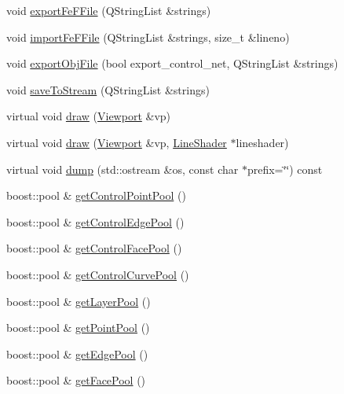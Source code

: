 \begin{DoxyCompactItemize}
\item 
void \hyperlink{classShipCAD_1_1SubdivisionSurface_ac6f3ca7c8c09acd6bc9c72ae063002bf}{export\-Fe\-F\-File} (Q\-String\-List \&strings)
\item 
void \hyperlink{classShipCAD_1_1SubdivisionSurface_aa3f1904bcec3f104cf465e3bed799406}{import\-Fe\-F\-File} (Q\-String\-List \&strings, size\-\_\-t \&lineno)
\item 
void \hyperlink{classShipCAD_1_1SubdivisionSurface_a8859af0a44d7f858d0febbd58efd2820}{export\-Obj\-File} (bool export\-\_\-control\-\_\-net, Q\-String\-List \&strings)
\item 
void \hyperlink{classShipCAD_1_1SubdivisionSurface_a77328f442672d72b4f9f1053b2cb2871}{save\-To\-Stream} (Q\-String\-List \&strings)
\item 
virtual void \hyperlink{classShipCAD_1_1SubdivisionSurface_acfe9cc964dbe05105486b43f2dc6fc4f}{draw} (\hyperlink{classShipCAD_1_1Viewport}{Viewport} \&vp)
\item 
virtual void \hyperlink{classShipCAD_1_1SubdivisionSurface_ab1c250ff9fa7acae3ecdca4575f3e259}{draw} (\hyperlink{classShipCAD_1_1Viewport}{Viewport} \&vp, \hyperlink{classShipCAD_1_1LineShader}{Line\-Shader} $\ast$lineshader)
\item 
virtual void \hyperlink{classShipCAD_1_1SubdivisionSurface_a6ed961bbb7ca5fe94ec5566109d9b015}{dump} (std\-::ostream \&os, const char $\ast$prefix=\char`\"{}\char`\"{}) const 
\item 
boost\-::pool \& \hyperlink{classShipCAD_1_1SubdivisionSurface_a49109b80a26f29ad52ac109574cf4d5a}{get\-Control\-Point\-Pool} ()
\item 
boost\-::pool \& \hyperlink{classShipCAD_1_1SubdivisionSurface_aa9ed4c00847b5c04f99b27f754df481b}{get\-Control\-Edge\-Pool} ()
\item 
boost\-::pool \& \hyperlink{classShipCAD_1_1SubdivisionSurface_ab9199097e998971add79f7dccbd262c3}{get\-Control\-Face\-Pool} ()
\item 
boost\-::pool \& \hyperlink{classShipCAD_1_1SubdivisionSurface_a647c0e4a20cfd823cc578431c2799c04}{get\-Control\-Curve\-Pool} ()
\item 
boost\-::pool \& \hyperlink{classShipCAD_1_1SubdivisionSurface_a7e80bac4f91557a620fc1843f77b9953}{get\-Layer\-Pool} ()
\item 
boost\-::pool \& \hyperlink{classShipCAD_1_1SubdivisionSurface_a8a8dbbc32fcdc5a08c462cd86c224649}{get\-Point\-Pool} ()
\item 
boost\-::pool \& \hyperlink{classShipCAD_1_1SubdivisionSurface_a2bffb2bf9575d934e18ed5087f8d2996}{get\-Edge\-Pool} ()
\item 
boost\-::pool \& \hyperlink{classShipCAD_1_1SubdivisionSurface_a3fcdae8e54e98938de00dfa4229d8aa8}{get\-Face\-Pool} ()
\end{DoxyCompactItemize}
